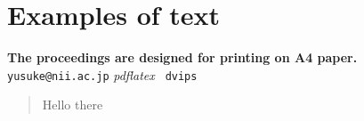 \documentclass[11pt]{article}
\begin{document}
\section{Examples of text}

\textbf{The proceedings are designed for printing on A4
  paper.}
\texttt{yusuke@nii.ac.jp}
\textit{pdflatex}
\texttt{ dvips}

\begin{quote}
Hello there
\end{quote}
\end{document}
